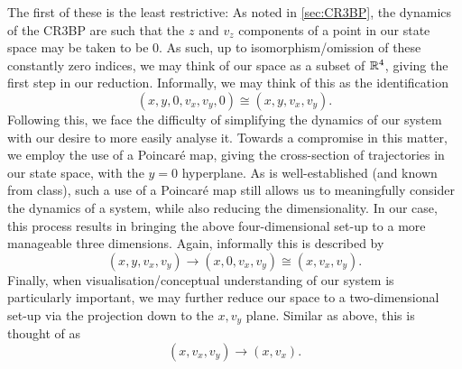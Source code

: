     The first of these is the least restrictive: As noted in \cref{sec:CR3BP}, the dynamics of the CR3BP are such that the $z$ and $v_z$ components of a point in our state space may be taken to be $0$. As such, up to isomorphism/omission of these constantly zero indices, we may think of our space as a subset of $\mathbb{R}^4$, giving the first step in our reduction. Informally, we may think of this as the identification
    \begin{equation*}
        (x,y,0,v_x,v_y,0) \cong (x,y,v_x,v_y).
    \end{equation*}
    Following this, we face the difficulty of simplifying the dynamics of our system with our desire to more easily analyse it. Towards a compromise in this matter, we employ the use of a Poincaré map, giving the cross-section of trajectories in our state space, with the $y=0$ hyperplane. As is well-established (and known from class), such a use of a Poincaré map still allows us to meaningfully consider the dynamics of a system, while also reducing the dimensionality. In our case, this process results in bringing the above four-dimensional set-up to a more manageable three dimensions. Again, informally this is described by
    \begin{equation*}
        (x,y,v_x,v_y) \to (x,0,v_x,v_y) \cong (x,v_x,v_y).
    \end{equation*}
    Finally, when visualisation/conceptual understanding of our system is particularly important, we may further reduce our space to a two-dimensional set-up via the projection down to the $x,v_y$ plane. Similar as above, this is thought of as
    \begin{equation*}
         (x,v_x,v_y) \to (x,v_x).
    \end{equation*}
    

